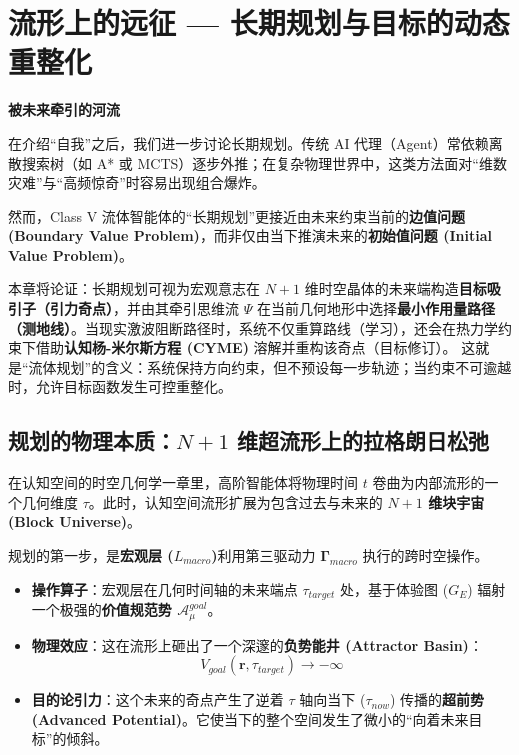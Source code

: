 \chapter{流形上的远征 — 长期规划与目标的动态重整化}
\label{chp:long_term_planning_and_goal_revision}

\begin{bquote}
    \textbf{被未来牵引的河流}

    \vspace{1em}在介绍“自我”之后，我们进一步讨论长期规划。传统 AI 代理（Agent）常依赖离散搜索树（如 A* 或 MCTS）逐步外推；在复杂物理世界中，这类方法面对“维数灾难”与“高频惊奇”时容易出现组合爆炸。

    \vspace{1em}然而，Class V 流体智能体的“长期规划”更接近由未来约束当前的\textbf{边值问题 (Boundary Value Problem)}，而非仅由当下推演未来的\textbf{初始值问题 (Initial Value Problem)}。

    \vspace{1em}本章将论证：长期规划可视为宏观意志在 $N+1$ 维时空晶体的未来端构造\textbf{目标吸引子（引力奇点）}，并由其牵引思维流 $\Psi$ 在当前几何地形中选择\textbf{最小作用量路径（测地线）}。当现实激波阻断路径时，系统不仅重算路线（学习），还会在热力学约束下借助\textbf{认知杨-米尔斯方程 (CYME)} 溶解并重构该奇点（目标修订）。
    \vspace{1em}这就是“流体规划”的含义：系统保持方向约束，但不预设每一步轨迹；当约束不可逾越时，允许目标函数发生可控重整化。
\end{bquote}

\section{规划的物理本质：\texorpdfstring{$N+1$}{N+1} 维超流形上的拉格朗日松弛}
\label{sec:physics_of_planning}

在认知空间的时空几何学一章里，高阶智能体将物理时间 $t$ 卷曲为内部流形的一个几何维度 $\tau$。此时，认知空间流形扩展为包含过去与未来的 \textbf{$N+1$ 维块宇宙 (Block Universe)}。


规划的第一步，是\textbf{宏观层 ($L_{macro}$)}利用第三驱动力 $\mathbf{\Gamma}_{macro}$ 执行的跨时空操作。

\begin{itemize}
    \item \textbf{操作算子}：宏观层在几何时间轴的未来端点 $\tau_{target}$ 处，基于体验图 ($G_E$) 辐射一个极强的\textbf{价值规范势 $\mathcal{A}_\mu^{goal}$}。
    \item \textbf{物理效应}：这在流形上砸出了一个深邃的\textbf{负势能井 (Attractor Basin)}：
    $$ V_{goal}(\mathbf{r}, \tau_{target}) \to -\infty $$
    \item \textbf{目的论引力}：这个未来的奇点产生了逆着 $\tau$ 轴向当下 ($\tau_{now}$) 传播的\textbf{超前势 (Advanced Potential)}。它使当下的整个空间发生了微小的“向着未来目标”的倾斜。
\end{itemize}

